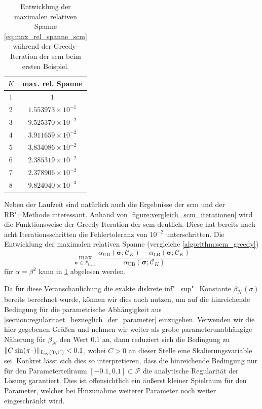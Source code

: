 \documentclass[../main.tex]{subfiles}
\begin{document}
\begin{table}[tb]
    \centering
    \begin{tabular}{|c|c|}\hline
     $K$ &      max. rel. Spanne \\ \hline
     $1$ &          $1$              \\ %
     $2$ & $1.553973{\times}10^{-1}$ \\ %
     $3$ & $9.525370{\times}10^{-2}$ \\ %
     $4$ & $3.911659{\times}10^{-2}$ \\ %
     $5$ & $3.834086{\times}10^{-2}$ \\ %
     $6$ & $2.385319{\times}10^{-2}$ \\ %
     $7$ & $2.378906{\times}10^{-2}$ \\ %
     $8$ & $9.824040{\times}10^{-3}$ \\ \hline
    \end{tabular}
    \caption[Entwicklung der maximalen relativen Spanne bei der \ac{scm}, erstes Beispiel.]{%
        Entwicklung der maximalen relativen Spanne \cref{eq:max_rel_spanne_scm} während der Greedy-Iteration der \ac{scm} beim ersten Beispiel.
    }
    \label{table:entwicklung_scm_abweichung}
\end{table}

Neben der Laufzeit sind natürlich auch die Ergebnisse der \ac{scm} und der RB"=Methode interessant.
Anhand von \cref{figure:vergleich_scm_iterationen} wird die Funktionsweise der Greedy-Iteration der \ac{scm} deutlich.
Diese hat bereits nach acht Iterationsschritten die Fehlertoleranz von $10^{-2}$ unterschritten.
Die Entwicklung der maximalen relativen Spanne (vergleiche \cref{algorithm:scm_greedy})
\begin{equation}\label{eq:max_rel_spanne_scm}
    \max_{\bm \sigma \in \mathcal P_{\mathrm{train}}}
    \frac{\alpha_{\mathrm{UB}}(\bm \sigma; \mathcal C_{K}) - \alpha_{\mathrm{LB}}(\bm \sigma; \mathcal C_{K})}{\alpha_{\mathrm{UB}}(\bm \sigma; \mathcal C_{K})}
\end{equation}
für $\alpha = \beta^{2}$ kann in \cref{table:entwicklung_scm_abweichung} abgelesen werden.

Da für diese Veranschaulichung die exakte diskrete inf"=sup"=Konstante $\beta_{\mathcal N}(\sigma)$ bereits berechnet wurde, können wir dies auch nutzen, um auf die hinreichende Bedingung für die parametrische Abhängigkeit aus \cref{section:regularitaet_bezueglich_der_parameter} einzugehen.
Verwenden wir die hier gegebenen Größen und nehmen wir weiter als grobe parameterunabhängige Näherung für $\beta_{\mathcal N}$ den Wert $0.1$ an, dann reduziert sich die Bedingung zu $\lVert C \sin(\pi {\mkern2mu\cdot\mkern2mu})\rVert_{L_{\infty}([0, 1])} < 0.1$, wobei $C > 0$ an dieser Stelle eine Skalierungsvariable sei.
Konkret lässt sich dies so interpretieren, dass die hinreichende Bedingung nur für den Parameterteilraum $[-0.1, 0.1] \subset \mathcal P$ die analytische Regularität der Lösung garantiert.
Dies ist offensichtlich ein äußerst kleiner Spielraum für den Parameter, welcher bei Hinzunahme weiterer Parameter noch weiter eingeschränkt wird.
\end{document}
